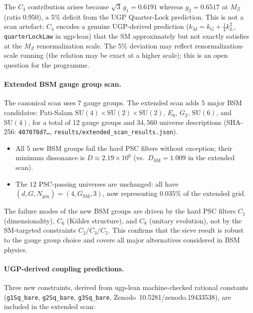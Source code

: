 \documentclass[11pt,twocolumn]{article}
\theoremstyle{remark}
\begin{document}
The $C_4$ contribution arises because
$\sqrt{3}\,g_1=0.6191$ whereas $g_2=0.6517$ at $M_Z$ (ratio $0.950$),
a $5\%$ deficit from the UGP Quarter-Lock prediction.
This is not a scan artefact: $C_4$ encodes a genuine UGP-derived
prediction ($k_M=k_G+\tfrac{1}{4}k_L^2$, \texttt{quarterLockLaw}
in ugp-lean) that the SM approximately but not exactly satisfies at
the $M_Z$ renormalization scale. The 5\% deviation may reflect
renormalization-scale running (the relation may be exact at a higher
scale); this is an open question for the programme.

\paragraph{Extended BSM gauge group scan.}
The canonical scan uses $7$ gauge groups.
The extended scan adds $5$ major BSM candidates:
Pati-Salam $\mathrm{SU}(4)\times\mathrm{SU}(2)\times\mathrm{SU}(2)$,
$E_6$, $G_2$, $\mathrm{SU}(6)$, and $\mathrm{SU}(4)$,
for a total of $12$ gauge groups and $34{,}560$ universe descriptions
(SHA-256: \texttt{407078d7\ldots},
\texttt{results/extended\_scan\_results.json}).
\begin{itemize}
  \item All $5$ new BSM groups fail the hard PSC filters without exception;
        their minimum dissonance is $D\approx 2.19\times10^6$ (vs.\
        $D_{\mathrm{SM}}=1.009$ in the extended scan).
  \item The $12$ PSC-passing universes are unchanged: all have
        $(d,G,N_{\mathrm{gen}})=(4,G_{\mathrm{SM}},3)$, now representing
        $0.035\%$ of the extended grid.
\end{itemize}
The failure modes of the new BSM groups are driven by the hard PSC
filters $C_1$ (dimensionality), $C_6$ (K\"{a}hler structure), and
$C_8$ (unitary evolution), not by the SM-targeted constraints
$C_2$/$C_3$/$C_5$.
This confirms that the sieve result is robust to the gauge group choice
and covers all major alternatives considered in BSM physics.

\paragraph{UGP-derived coupling predictions.}
Three new constraints, derived from ugp-lean machine-checked rational
constants (\texttt{g1Sq\_bare}, \texttt{g2Sq\_bare}, \texttt{g3Sq\_bare},
Zenodo~10.5281/zenodo.19433538), are included in the extended scan:
\end{document}
